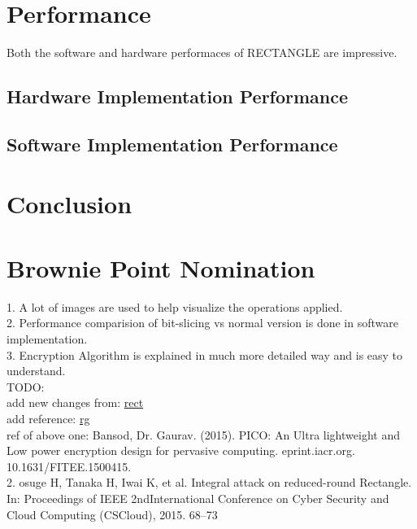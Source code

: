 \documentclass[final]{transcrypto}
\begin{document}
\section{Performance}
Both the software and hardware performaces of RECTANGLE are impressive. 
\subsection{Hardware Implementation Performance}

\subsection{Software Implementation Performance}

\section{Conclusion}


\section{Brownie Point Nomination}
1. A lot of images are used to help visualize the operations applied.\\
2. Performance comparision of bit-slicing vs normal version is done in software implementation.\\
3. Encryption Algorithm is explained in much more detailed way and is easy to understand.\\


TODO:\\
add new changes from: \href{https://www.cryptolux.org/index.php/Lightweight_Block_Ciphers#Rectangle}{rect}\\
add reference: \href{https://www.researchgate.net/figure/S-box-design-consideration_tbl4_280218646}{rg}\\
ref of above one: Bansod, Dr. Gaurav. (2015). PICO: An Ultra lightweight and Low power encryption design for pervasive computing. eprint.iacr.org. 10.1631/FITEE.1500415. \\

2. osuge H, Tanaka H, Iwai K, et al.  Integral attack on reduced-round Rectangle.  In: Proceedings of IEEE 2ndInternational Conference on Cyber Security and Cloud Computing (CSCloud), 2015. 68–73\\
\end{document}
